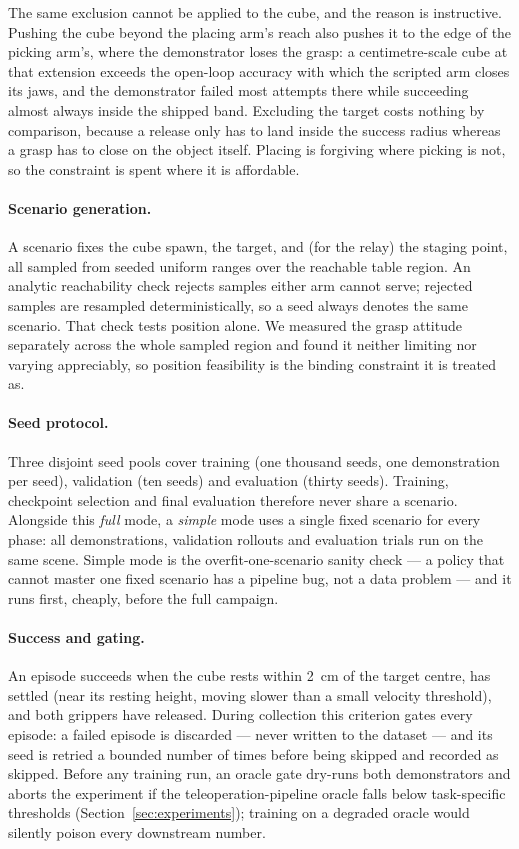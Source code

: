 The same exclusion cannot be applied to the cube, and the reason is
instructive. Pushing the cube beyond the placing arm's reach also pushes
it to the edge of the picking arm's, where the demonstrator loses the
grasp: a centimetre-scale cube at that extension exceeds the open-loop
accuracy with which the scripted arm closes its jaws, and the
demonstrator failed most attempts there while succeeding almost always
inside the shipped band. Excluding the target costs nothing by
comparison, because a release only has to land inside the success
radius whereas a grasp has to close on the object itself. Placing is
forgiving where picking is not, so the constraint is spent where it is
affordable.

\paragraph{Scenario generation.}
A scenario fixes the cube spawn, the target, and (for the relay) the
staging point, all sampled from seeded uniform ranges over the reachable
table region. An analytic reachability check rejects samples either arm
cannot serve; rejected samples are resampled deterministically, so a
seed always denotes the same scenario. That check tests position alone.
We measured the grasp attitude separately across the whole sampled
region and found it neither limiting nor varying appreciably, so
position feasibility is the binding constraint it is treated as.

\paragraph{Seed protocol.}
Three disjoint seed pools cover training (one thousand seeds, one
demonstration per seed), validation (ten seeds) and evaluation (thirty
seeds). Training, checkpoint selection and final evaluation therefore
never share a scenario. Alongside this \emph{full} mode, a \emph{simple}
mode uses a single fixed scenario for every phase: all demonstrations,
validation rollouts and evaluation trials run on the same scene. Simple
mode is the overfit-one-scenario sanity check --- a policy that cannot
master one fixed scenario has a pipeline bug, not a data problem --- and
it runs first, cheaply, before the full campaign.

\paragraph{Success and gating.}
An episode succeeds when the cube rests within \SI{2}{\centi\metre} of
the target centre, has settled (near its resting height, moving slower
than a small velocity threshold), and both grippers have released.
During collection this criterion gates every episode: a failed episode
is discarded --- never written to the dataset --- and its seed is
retried a bounded number of times before being skipped and recorded as
skipped. Before any training run, an oracle gate dry-runs both
demonstrators and aborts the experiment if the teleoperation-pipeline
oracle falls below task-specific thresholds
(Section~\ref{sec:experiments}); training on a degraded oracle would
silently poison every downstream number.
